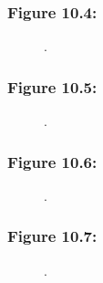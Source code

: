 \documentclass[t]{beamer}\usepackage[]{graphicx}\usepackage[]{color}
\begin{document}
\begin{frame}[label=Figure_10_4]
\frametitle{Figure 10.4: }
\begin{figure}[t]
\begin{minipage}[b]{\textwidth}
\centering

\caption{.}
\end{minipage}
\end{figure}
\end{frame}


\begin{frame}[label=Figure_10_5]
\frametitle{Figure 10.5: }
\begin{figure}[t]
\begin{minipage}[b]{\textwidth}
\centering

\caption{.}
\end{minipage}
\end{figure}
\end{frame}


\begin{frame}[label=Figure_10_6]
\frametitle{Figure 10.6: }
\begin{figure}[t]
\begin{minipage}[b]{\textwidth}
\centering

\caption{.}
\end{minipage}
\end{figure}
\end{frame}


\begin{frame}[label=Figure_10_7]
\frametitle{Figure 10.7: }
\begin{figure}[t]
\begin{minipage}[b]{\textwidth}
\centering

\caption{.}
\end{minipage}
\end{figure}
\end{frame}
\end{document}
